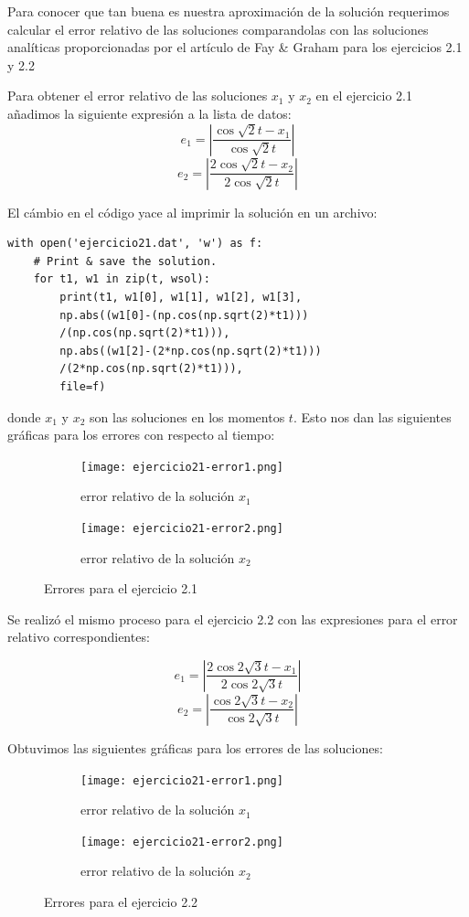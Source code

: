 \documentclass{article}
\begin{document}
Para conocer que tan buena es nuestra aproximación de la solución requerimos calcular el error relativo de las soluciones comparandolas con las soluciones analíticas proporcionadas por el artículo de Fay \& Graham para los ejercicios 2.1 y 2.2

Para obtener el error relativo de las soluciones $x_1$ y $x_2$ en el ejercicio 2.1 añadimos la siguiente expresión a la lista de datos:
\[ e_1=\left|\frac{\cos\sqrt{2}t-x_1}{\cos\sqrt{2}t}\right| \]
\[ e_2=\left|\frac{2\cos\sqrt{2}t-x_2}{2\cos\sqrt{2}t}\right| \]

El cámbio en el código yace al imprimir la solución en un archivo:

\begin{framed}
\begin{verbatim}
with open('ejercicio21.dat', 'w') as f:
    # Print & save the solution.
    for t1, w1 in zip(t, wsol):
        print(t1, w1[0], w1[1], w1[2], w1[3],
        np.abs((w1[0]-(np.cos(np.sqrt(2)*t1)))
        /(np.cos(np.sqrt(2)*t1))),
        np.abs((w1[2]-(2*np.cos(np.sqrt(2)*t1)))
        /(2*np.cos(np.sqrt(2)*t1))),
        file=f)
\end{verbatim}
\end{framed} 

donde $x_1$ y $x_2$ son las soluciones en los momentos $t$. Esto nos dan las siguientes gráficas para los errores con respecto al tiempo:

\begin{figure}[ht!]
	\begin{subfigure}[b]{0.5\linewidth}
    \raggedleft
	\texttt{[image: ejercicio21-error1.png]}
    \caption{error relativo de la solución $x_1$}
	\end{subfigure}
	\begin{subfigure}[b]{0.5\linewidth}
    \raggedright
	\texttt{[image: ejercicio21-error2.png]}
	\caption{error relativo de la solución $x_2$}
    \end{subfigure}
    \caption{Errores para el ejercicio 2.1}
\end{figure}

Se realizó el mismo proceso para el ejercicio 2.2 con las expresiones para el error relativo correspondientes:

\[ e_1=\left|\frac{2\cos2\sqrt{3}t-x_1}{2\cos2\sqrt{3}t}\right| \]
\[ e_2=\left|\frac{\cos2\sqrt{3}t-x_2}{\cos2\sqrt{3}t}\right| \]

Obtuvimos las siguientes gráficas para los errores de las soluciones:

\begin{figure}[ht!]
	\begin{subfigure}[b]{0.5\linewidth}
    \raggedleft
	\texttt{[image: ejercicio21-error1.png]}
    \caption{error relativo de la solución $x_1$}
	\end{subfigure}
	\begin{subfigure}[b]{0.5\linewidth}
    \raggedright
	\texttt{[image: ejercicio21-error2.png]}
	\caption{error relativo de la solución $x_2$}
    \end{subfigure}
    \caption{Errores para el ejercicio 2.2}
\end{figure}
\end{document}
